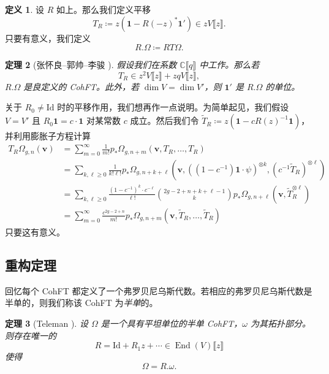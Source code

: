 \documentclass{amsart}
\newtheorem{thm}{定理}[section]
\theoremstyle{definition}
\newtheorem{defn}[thm]{定义}
\theoremstyle{remark}
\theoremstyle{plain}
\theoremstyle{definition}
\theoremstyle{remark}
\newcommand{\C}{\mathbb{C}}
\newcommand{\mbf}[1]{\mathbf{#1}}
\newcommand{\bv}{\mbf{v}}
\newcommand{\mr}[1]{\mathrm{#1}}
\newcommand{\1}{\mathbf{1}}
\newcommand{\2}{\mathbf{2}}
\newcommand{\3}{\mathbf{3}}
\newcommand{\ps}[1]{\llbracket #1 \rrbracket}
\DeclareMathOperator{\End}{End}
\begin{document}
\begin{defn}
    设 $R$ 如上。那么我们定义平移
    \[ T_R \coloneqq z (\1 - R(-z)^* \1') \in z V\ps{z}. \]
    只要有意义，我们定义
    \[ R.\Omega \coloneqq RT\Omega. \]
\end{defn}

\begin{thm}[张怀良–郭帅–李骏 {\cite[Theorem~2.7]{CGL2026}}]
    假设我们在系数 $\C\ps{q}$ 中工作。那么若
    \[ T_R \in z^2 V \ps{z} + zq V \ps{z}, \]
    $R.\Omega$ 是良定义的 CohFT。此外，若 $\dim V = \dim V'$，则 $\1'$ 是 $R.\Omega$ 的单位。
\end{thm}

关于 $R_0 \neq \mr{Id}$ 时的平移作用，我们想再作一点说明。为简单起见，我们假设 $V = V'$ 且 $R_0 \1 = c \cdot \1$ 对某常数 $c$ 成立。然后我们令 $\tilde{T}_R \coloneqq z( \1 - c R(z)^{-1} \1)$，并利用膨胀子方程计算
\begin{align*}
    T_R \Omega_{g,n}(\bv) &= \sum_{m=0}^{\infty} \frac{1}{m!} p_*\Omega_{g,n+m}(\bv, T_R, \ldots, T_R) \\
    &= \sum_{k,\ell \geq 0} \frac{1}{k!\ell!} p_* \Omega_{g,n+k+\ell}(\bv, ( (1-c^{-1})\1 \cdot \psi )^{\otimes k}, ( c^{-1} \tilde{T}_R )^{\otimes \ell}) \\
    &= \sum_{k,\ell \geq 0} \frac{(1-c^{-1})^k \cdot c^{-\ell}}{\ell!} \binom{2g-2+n+k+\ell-1}{k} p_* \Omega_{g,n+\ell}(\bv, \tilde{T}_R^{\otimes \ell}) \\
    &= \sum_{m=0}^{\infty} \frac{c^{2g-2+n}}{m!} p_* \Omega_{g,n+m}(\bv, \tilde{T}_R, \ldots, \tilde{T}_R)
\end{align*}
只要这有意义。
\subsection{重构定理}%
\label{sub:Reconstruction theorem}

回忆每个 CohFT 都定义了一个弗罗贝尼乌斯代数。若相应的弗罗贝尼乌斯代数是半单的，则我们称该 CohFT 为\textit{半单}的。

\begin{thm}[Teleman {\cite{Teleman2012}}]%
\label{thm:teleman}
    设 $\Omega$ 是一个具有平坦单位的半单 CohFT，$\omega$ 为其拓扑部分。则存在唯一的
    \[ R = \mr{Id} + R_1 z + \cdots \in \End(V)\ps{z} \]
    使得
    \[ \Omega = R.\omega. \]
\end{thm}
\end{document}
